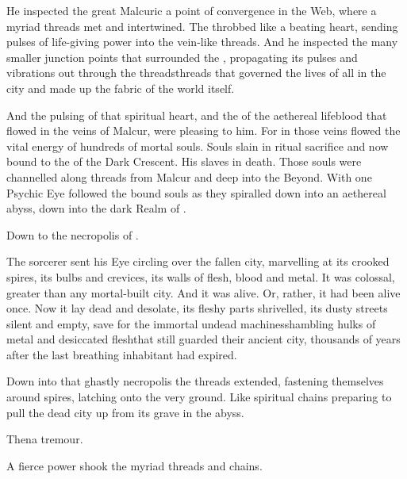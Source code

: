 \begin{garbage}
He inspected the great Malcuric \nexus{}\dash a point of convergence in the Web, where a myriad threads met and intertwined. 
The \nexus{} throbbed like a beating heart, sending pulses of life-giving power into the vein-like threads. 
And he inspected the many smaller junction points that surrounded the \nexus, propagating its pulses and vibrations out through the threads\dash threads that governed the lives of all in the city and made up the fabric of the world itself. 

And the pulsing of that spiritual heart, and the \colour of the aethereal lifeblood that flowed in the veins of Malcur, were pleasing to him. 
For in those veins flowed the vital energy of hundreds of mortal souls. 
Souls slain in ritual sacrifice and now bound to the \Matrix{} of the Dark Crescent. 
His slaves in death. 
Those souls were channelled along threads from Malcur and deep into the Beyond. 
With one Psychic Eye \Psyrex{} followed the bound souls as they spiralled down into an aethereal abyss, down into the dark Realm of \Machai. 

Down to the necropolis of \Nithdornazsh. 

The sorcerer sent his Eye circling over the fallen city, marvelling at its crooked spires, its bulbs and crevices, its walls of flesh, blood and metal. 
It was colossal, greater than any mortal-built city. 
And it was alive. 
Or, rather, it had been alive once. 
Now it lay dead and desolate, its fleshy parts shrivelled, its dusty streets silent and empty, save for the immortal undead machines\dash shambling hulks of metal and desiccated flesh\dash that still guarded their ancient city, thousands of years after the last breathing inhabitant had expired. 

Down into that ghastly necropolis the threads extended, fastening themselves around spires, latching onto the very ground. 
Like spiritual chains preparing to pull the dead city up from its grave in the abyss. 

Then\prikker a tremour. 

A fierce power shook the myriad threads and chains. 

\end{garbage}
